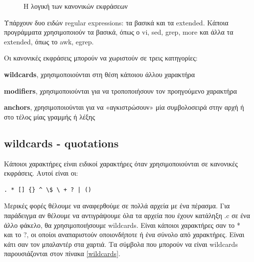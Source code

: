\begin{figure}
	\centering
	\caption{Η λογική των κανονικών εκφράσεων}
	\label{fig:reg-ex}
\end{figure} 

Υπάρχουν δυο ειδών regular expressions: τα βασικά και τα extended. Κάποια προγράμματα χρησιμοποιούν τα βασικά, όπως ο vi, sed, grep, more και άλλα τα extended, όπως το awk, egrep.

Οι κανονικές εκφράσεις μπορούν να χωριστούν σε τρεις κατηγορίες:
\begin{packed_item}
	\item \textbf{wildcards}, χρησιμοποιούνται στη θέση κάποιου άλλου χαρακτήρα
	\item \textbf{modifiers}, χρησιμοποιούνται για να τροποποιήσουν τον προηγούμενο χαρακτήρα
	\item \textbf{anchors}, χρησιμοποιούνται για να «αγκιστρώσουν» μία συμβολοσειρά στην αρχή ή στο τέλος μίας γραμμής ή λέξης
\end{packed_item}

\subsection{wildcards - quotations}

Κάποιοι χαρακτήρες είναι ειδικοί χαρακτήρες όταν χρησιμοποιούνται σε κανονικές εκφράσεις. Αυτοί είναι οι:
\begin{lstlisting}
. * [] {} ^ \$ \ + ? | ()
\end{lstlisting}


Μερικές φορές θέλουμε να αναφερθούμε σε πολλά αρχεία με ένα πέρασμα. Για παράδειγμα αν θέλουμε να αντιγράψουμε όλα τα αρχεία που έχουν
κατάληξη .c σε ένα άλλο φάκελο, θα χρησιμοποιήσουμε wildcards. Είναι κάποιοι χαρακτήρες σαν το * και το ?, οι οποίοι αναπαριστούν
οποιονδήποτε ή ένα σύνολο από χαρακτήρες. Είναι κάτι σαν τον μπαλαντέρ στα χαρτιά. Τα σύμβολα που μπορούν να είναι wildcards παρουσιάζονται
στον πίνακα \ref{wildcards}.


